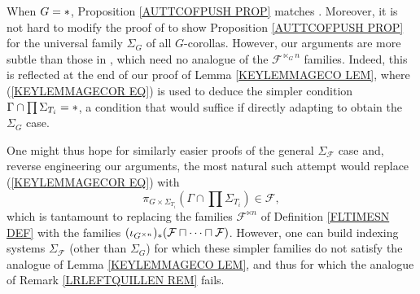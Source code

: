 \documentclass[a4paper,10pt]{article}%
\begin{document}
\begin{remark}
When $G=\**$, Proposition \ref{AUTTCOFPUSH PROP}
matches \cite[Lemma 5.9]{BM08}.
Moreover, it is not hard to modify the proof of \cite[Lemma 5.9]{BM08} to show Proposition \ref{AUTTCOFPUSH PROP} for the universal family $\Sigma_G$ of all $G$-corollas.
However, our arguments are more subtle than those in 
\cite{BM08}, which need no analogue
of the $\mathcal{F}^{\ltimes_G n}$ families.
Indeed, this is reflected 
at the end of our proof of Lemma \ref{KEYLEMMAGECO LEM}, where (\ref{KEYLEMMAGECOR EQ})
is used to deduce the simpler condition
$\Gamma \cap \prod \Sigma_{T_i} = \**$,
a condition that would suffice
if directly adapting \cite[Lemma 5.9]{BM08}
to obtain the $\Sigma_G$ case.

One might thus hope for similarly easier proofs of the general $\Sigma_{\mathcal{F}}$ case and,
reverse engineering our arguments,
the most natural such attempt would replace 
(\ref{KEYLEMMAGECOR EQ}) with
\[
\pi_{G \times \Sigma_{T_i}}(\Gamma \cap \prod \Sigma_{T_i})
\in \mathcal{F},
\]
which is tantamount to 
replacing the families 
$\mathcal{F}^{\ltimes n}$ of Definition \ref{FLTIMESN DEF} with the families
$(\iota_{G^{\times n}})_{\**}
(\mathcal{F} \sqcap \cdots \sqcap \mathcal{F})$.
However, one can build indexing systems $\Sigma_{\mathcal{F}}$ (other than $\Sigma_G$) for which these simpler families do not satisfy the analogue of 
Lemma \ref{KEYLEMMAGECO LEM}, 
and thus for which the analogue of Remark \ref{LRLEFTQUILLEN REM} fails.

\end{remark}
\end{document}
